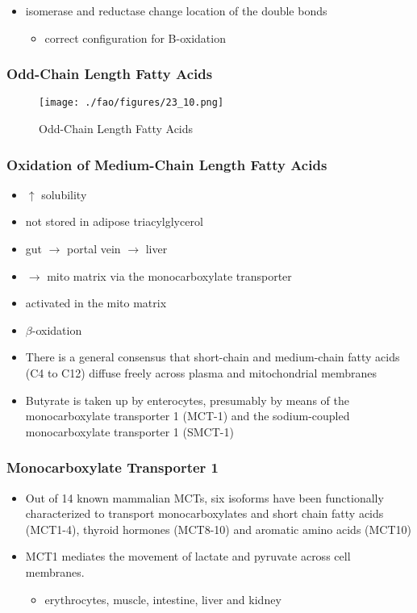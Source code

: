 \documentclass{scrartcl}
\begin{document}
\begin{itemize}
\item isomerase and reductase change location of the double bonds
\begin{itemize}
\item correct configuration for B-oxidation
\end{itemize}
\end{itemize}
\subsubsection{Odd-Chain Length Fatty Acids}
\label{sec:orgf4d64a1}
\begin{figure}[htbp]
\centering
\texttt{[image: ./fao/figures/23\_10.png]}
\caption{\label{fig:orge587478}
Odd-Chain Length Fatty Acids}
\end{figure}

\subsubsection{Oxidation of Medium-Chain Length Fatty Acids}
\label{sec:org066ae35}

\begin{itemize}
\item \(\uparrow\) solubility
\item not stored in adipose triacylglycerol
\item gut \(\to\) portal vein \(\to\) liver
\item \(\to\) mito matrix via the monocarboxylate transporter
\item activated in the mito matrix
\item \(\beta\)-oxidation

\item There is a general consensus that short-chain and medium-chain fatty
acids (C4 to C12) diffuse freely across plasma and mitochondrial
membranes
\item Butyrate is taken up by enterocytes, presumably by means of the
monocarboxylate transporter 1 (MCT-1) and the sodium-coupled
monocarboxylate transporter 1 (SMCT-1)
\end{itemize}

\subsubsection{Monocarboxylate Transporter 1}
\label{sec:orgcbd74f0}
\begin{itemize}
\item Out of 14 known mammalian MCTs, six isoforms have been functionally
characterized to transport monocarboxylates and short chain fatty
acids (MCT1-4), thyroid hormones (MCT8-10) and aromatic amino
acids (MCT10)

\item MCT1 mediates the movement of lactate and pyruvate across cell
membranes.
\begin{itemize}
\item erythrocytes, muscle, intestine, liver and kidney
\end{itemize}
\end{itemize}
\end{document}
